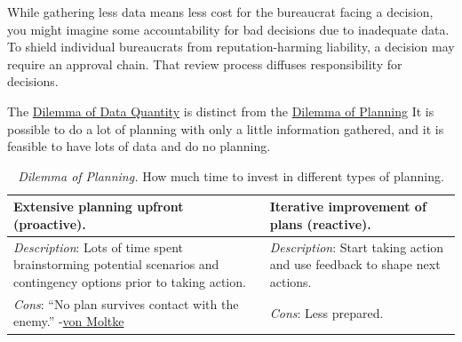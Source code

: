 While gathering less data means less cost for the bureaucrat facing a decision, you might imagine some accountability for bad decisions due to inadequate data. To shield individual bureaucrats from reputation-harming liability, a decision may require an approval chain. That review process diffuses responsibility for decisions.


The \hyperref[table:dilemma-personal-gather-data-lots-vs-little]{Dilemma of Data Quantity} 
 is distinct from the \hyperref[table:dilemma-personal-planning-vs-iterate]{Dilemma of Planning}\iftoggle{printedonpaper}{ (\ref{table:dilemma-personal-planning-vs-iterate}).}{.} 
 It 
is possible to do a lot of planning with only a little information gathered, and it is feasible to have lots of data and do no planning. 

\begin{center}
\begin{table}[H] %
\begin{tabular}{ | m{\dilemmatablewidth}| m{\dilemmatablewidth} | } 
  \hline
  \textbf{Extensive planning upfront (proactive).} & 
  \textbf{Iterative improvement of plans (reactive).} \\ 
  \hline
  \textit{Description}: Lots of time spent brainstorming potential scenarios and contingency options prior to taking action. & 
  \textit{Description}: Start taking action and use feedback to shape next actions. \\ 
  \hline
  \textit{Cons}: ``No plan survives contact with the enemy.'' {\small -\href{https://en.wikipedia.org/wiki/Helmuth_von_Moltke_the_Elder}{von Moltke}
  \index{Wikipedia!Moltke@\href{https://en.wikipedia.org/wiki/Helmuth_von_Moltke_the_Elder}{Moltke, Helmuth von}}
  } & 
  \textit{Cons}: Less prepared. \\  
  \hline
\end{tabular}
\caption{
\textit{Dilemma of Planning.}
How much time to invest in different types of planning.
}
\label{table:dilemma-personal-planning-vs-iterate}
\end{table}
\end{center}

